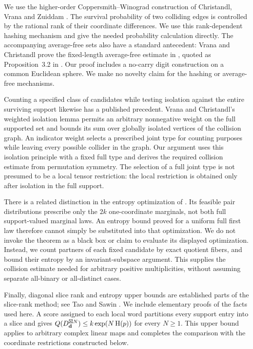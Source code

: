 We use the higher-order Coppersmith--Winograd construction of
Christandl, Vrana and Zuiddam
\cite[Theorem~1.52 and Section~3.3]{CVZ2019}. The survival probability
of two colliding edges is
controlled by the rational rank of their coordinate differences. We use
this rank-dependent hashing mechanism and give the needed probability
calculation directly. The accompanying average-free sets also have a
standard antecedent: Vrana and Christandl prove the fixed-length
average-free estimate in \cite[Lemma~10 and Appendix~A]{VC2015}, quoted
as Proposition~3.2 in \cite{CVZ2019}. Our proof includes a no-carry digit
construction on a common Euclidean sphere. We make no novelty claim for
the hashing or average-free mechanisms.

Counting a specified class of candidates while testing isolation against
the entire surviving support likewise has a published precedent.
Vrana and Christandl's weighted isolation lemma
\cite[Lemma~2.3, arXiv version~2]{VC2019} permits an arbitrary nonnegative weight on the
full supported set and bounds its sum over globally isolated vertices
of the collision graph. An indicator weight selects a prescribed joint
type for counting purposes while leaving every possible collider in the
graph. Our argument uses this isolation principle with a fixed full
type and derives the required collision estimate from permutation
symmetry. The selection of a full joint type is not presumed to be a
local tensor restriction: the local restriction is obtained only after
isolation in the full support.

There is a related distinction in the entropy optimization of
\cite[Theorem~1.52]{CVZ2019}. Its feasible pair distributions prescribe
only the $2k$ one-coordinate marginals, not both full support-valued
marginal laws. An entropy bound proved for a uniform full first law
therefore cannot simply be substituted into that optimization. We do
not invoke the theorem as a black box or claim to evaluate its displayed
optimization. Instead, we count partners of each fixed candidate by
exact quotient fibers, and bound their entropy by an invariant-subspace
argument. This supplies the collision estimate needed for arbitrary
positive multiplicities, without assuming separate all-binary or
all-distinct cases.

Finally, diagonal slice rank and entropy upper bounds are established
parts of the slice-rank method; see Tao and Sawin
\cite[Example~5 and Proposition~6]{TaoSawin2016}. We include elementary
proofs of the facts used here. A score assigned to each local word
partitions every support entry into a slice and gives
$Q(D_{\mathbf d}^{\boxtimes N})\le k\exp(N\operatorname{H}(p))$ for every $N\ge1$.
This upper bound applies to arbitrary complex linear maps and completes
the comparison with the coordinate restrictions constructed below.
